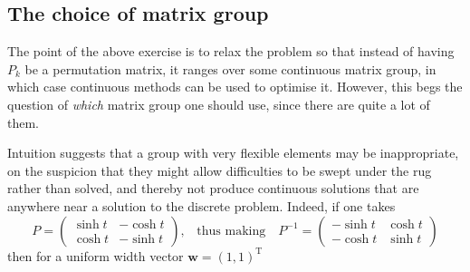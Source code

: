 \documentclass{article}
\newcommand{\transpose}[1]{#1^{\mathrm{T}}}
\newcommand{\vek}{\mathbf}
\theoremstyle{definition}
\begin{document}
\subsection{The choice of matrix group}

The point of the above exercise is to relax the problem so that 
instead of having $P_k$ be a permutation matrix, it ranges over some 
continuous matrix group, in which case continuous methods can be used 
to optimise it. However, this begs the question of \emph{which} matrix 
group one should use, since there are quite a lot of them.

Intuition suggests that a group with very flexible elements may be 
inappropriate, on the suspicion that they might allow difficulties to 
be swept under the rug rather than solved, and thereby not produce 
continuous solutions that are anywhere near a solution to the 
discrete problem. Indeed, if one takes
\begin{equation*}
  P = \begin{pmatrix}
    \sinh t & -\cosh t \\ \cosh t & -\sinh t
  \end{pmatrix}
  \text{,}\quad\text{thus making}\quad
  P^{-1} = \begin{pmatrix}
    -\sinh t & \cosh t \\ -\cosh t & \sinh t
  \end{pmatrix}
\end{equation*}
then for a uniform width vector \(\vek{w} = \transpose{(1,1)}\)
\end{document}
